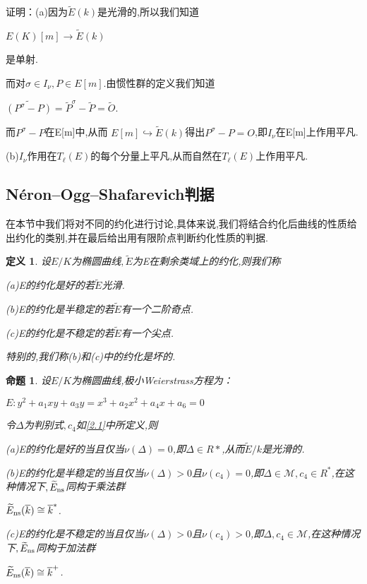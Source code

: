 \documentclass[11pt]{ctexart}
\newtheorem{defi}{定义}[section]
\newtheorem{pro}{命题}[section]
\begin{document}
\noindent 证明：(a)因为$\widetilde{E}(k)$是光滑的,所以我们知道
\begin{center}
    $E(K)[m]\rightarrow \widetilde{E}(k)$
\end{center}
是单射.

而对$\sigma \in I_{\nu},P\in E[m]$.由惯性群的定义我们知道
\begin{center}
    $\widetilde{(P^{\sigma}-P)}=\widetilde{P}^{\sigma}-\widetilde{P}=\widetilde{O}$.
\end{center}
而$P^{\sigma}-P$在E[m]中,从而 $E[m]\hookrightarrow  \widetilde{E}(k)$得出$P^{\sigma}-P=O$,即$I_{\nu}$在E[m]上作用平凡.

(b)$I_{\nu}$作用在$T_{\ell}(E)$的每个分量上平凡,从而自然在$T_{\ell}(E)$上作用平凡.










\subsection{Néron--Ogg--Shafarevich判据}
 在本节中我们将对不同的约化进行讨论,具体来说,我们将结合约化后曲线的性质给出约化的类别,并在最后给出用有限阶点判断约化性质的判据.

\begin{defi}设$E/K$为椭圆曲线$,\widetilde{E}$为E在剩余类域上的约化,则我们称

    (a)E的约化是好的若$\widetilde{E}$光滑.

    (b)E的约化是半稳定的若$\widetilde{E}$有一个二阶奇点.

    (c)E的约化是不稳定的若$\widetilde{E}$有一个尖点.

     \noindent 特别的,我们称(b)和(c)中的约化是坏的.
\end{defi}


\begin{pro}设$E/K$为椭圆曲线,极小Weierstrass方程为：
    \begin{center}
        $E:y^2+a_1xy+a_3y=x^3+a_2x^2+a_4x+a_6=0$
    \end{center}
    令$\Delta$为判别式$,c_4$如\ref{2.1}中所定义,则

    (a)E的约化是好的当且仅当$\nu(\Delta)=0$,即$\Delta \in R{*}$,从而$\widetilde{E}/k$是光滑的.

    (b)E的约化是半稳定的当且仅当$\nu(\Delta)>0$且$\nu(c_4)=0$,即$\Delta \in \mathcal{M},c_4\in R^{*} $,在这种情况下$,\widetilde{E}_{\textup{ns}}$同构于乘法群
    \begin{center}
        $\widetilde{E}_{\textup{ns}}(\overline{k}) \cong \overline{k}^{*}$.
    \end{center}

    (c)E的约化是不稳定的当且仅当$\nu(\Delta)>0$且$\nu(c_4)>0$,即$\Delta,c_4\in\mathcal{M} $,在这种情况下$,\widetilde{E}_{\textup{ns}}$同构于加法群
    \begin{center}
        $\widetilde{E}_{\textup{ns}}(\overline{k}) \cong \overline{k}^{+}$.
    \end{center}


\end{pro}
\end{document}
